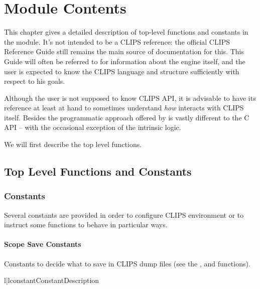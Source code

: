 \chapter{Module Contents\label{pyclips-modulecontents}}

This chapter gives a detailed description of top-level functions and
constants in the \pyclips{} module. It's not intended to be a CLIPS
reference: the official CLIPS Reference Guide still remains the main
source of documentation for this. This Guide will often be referred to
for information about the engine itself, and the user is expected to
know the CLIPS language and structure sufficiently with respect to his
goals.

Although the \pyclips{} user is not supposed to know CLIPS API, it is
advisable to have its reference at least at hand to sometimes understand
\emph{how} \pyclips{} interacts with CLIPS itself. Besides the programmatic
approach offered by \pyclips{} is vastly different to the C API -- with
the occasional exception of the intrinsic logic.

We will first describe the top level functions.

\section{Top Level Functions and Constants\label{pyclips-toplevel}}

\subsection{Constants\label{pyclips-tl-constants}}

Several constants are provided in order to configure CLIPS environment
or to instruct some functions to behave in particular ways.


\subsubsection{Scope Save Constants}

Constants to decide what to save in CLIPS dump files (see the
,  and
 functions).

\begin{tableii}{l|l}{constant}{Constant}{Description}
\end{tableii}


